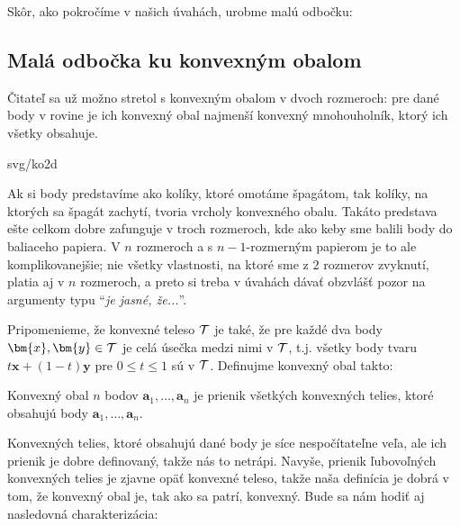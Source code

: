
\noindent
Skôr, ako pokročíme v našich úvahách, urobme malú odbočku:


\vspace*{-4ex}
\noindent
{}
\begin{shaded}
\subsection*{Malá odbočka ku konvexným obalom}

\noindent
Čitateľ sa už možno stretol s konvexným obalom v dvoch rozmeroch: pre dané body
v rovine je ich konvexný obal najmenší konvexný mnohouholník, ktorý ich všetky obsahuje.


\noindent
\begin{minipage}[t]{3.5cm}
  \vspace{0pt}
  \begin{myfig}{\textwidth}{svg/ko2d}
  \end{myfig}
\end{minipage}\hspace*{1cm}\begin{minipage}[t]{\textwidth-4.5cm}
  \vspace{0pt}
\noindent
Ak si body predstavíme ako kolíky, ktoré omotáme špagátom, tak kolíky, na ktorých 
sa špagát zachytí, tvoria vrcholy konvexného obalu. Takáto predstava ešte celkom dobre zafunguje
v troch rozmeroch, kde ako keby sme balili body do baliaceho papiera. V $n$ rozmeroch
a s  $n-1$-rozmerným papierom je to ale komplikovanejšie; nie všetky vlastnosti, 
na ktoré sme z 2 rozmerov zvyknutí, platia aj v $n$ rozmeroch, a preto si treba v úvahách
dávať obzvlášť pozor na argumenty typu ``{\em je jasné, že...}''.
\end{minipage}


\vspace*{-3ex}
\noindent
Pripomenieme, že konvexné teleso $\cal T$ je také, že pre každé dva body $\bm{x},
\bm{y}\in{\cal T}$ je celá úsečka medzi nimi v $\cal T$, t.j. všetky body
tvaru $t\bm{x}+(1-t)\bm{y}$ pre $0\le t\le 1$ sú v $\cal T$. 
Definujme konvexný obal takto:

\begin{dfn}
Konvexný obal $n$ bodov $\bm{a}_1,\ldots,\bm{a}_n$ je 
prienik všetkých konvexných telies, ktoré obsahujú body $\bm{a}_1,\ldots,\bm{a}_n$.
\end{dfn}

\noindent
Konvexných telies, ktoré obsahujú dané body je síce nespočítateľne veľa, ale ich prienik
je dobre definovaný, takže nás to netrápi.
Navyše, prienik ľubovoľných konvexných telies je zjavne opäť konvexné teleso, takže 
naša definícia je dobrá v tom, že konvexný obal je, tak ako sa patrí, konvexný. 
Bude
sa nám hodiť aj nasledovná charakterizácia:


\end{shaded}
